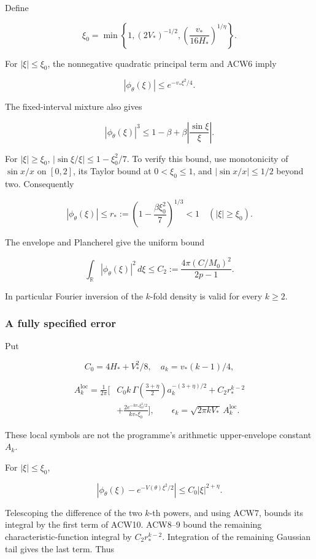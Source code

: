 Define

\[
\xi_0=\min\left\{1,(2V_*)^{-1/2},
\left(\frac{v_*}{16H_*}\right)^{1/\eta}\right\}.
\]

For \(|\xi|\le\xi_0\), the nonnegative quadratic principal term and ACW6 imply

\[
|\phi_\theta(\xi)|\le e^{-v_*\xi^2/4}.
\tag{ACW7}
\]

The fixed-interval mixture also gives

\[
|\phi_\theta(\xi)|^3\le1-\beta+\beta\left|\frac{\sin\xi}{\xi}\right|.
\]

For \(|\xi|\ge\xi_0\),
\(|\sin\xi/\xi|\le1-\xi_0^2/7\). To verify this bound, use monotonicity of \(\sin x/x\) on \([0,2]\), its Taylor bound at \(0<\xi_0\le1\), and \(|\sin x/x|\le1/2\) beyond two. Consequently

\[
|\phi_\theta(\xi)|\le r_*
:=\left(1-\frac{\beta\xi_0^2}{7}\right)^{1/3}<1
\quad(|\xi|\ge\xi_0).
\tag{ACW8}
\]

The envelope and Plancherel give the uniform bound

\[
\int_{\mathbb R}|\phi_\theta(\xi)|^2\,d\xi
\le C_2:=\frac{4\pi(C/M_0)^2}{2p-1}.
\tag{ACW9}
\]

In particular Fourier inversion of the \(k\)-fold density is valid for every \(k\ge2\).

\subsubsection{A fully specified error}\label{acw:a-fully-specified-error}

Put

\[
C_0=4H_*+V_*^2/8,\quad a_k=v_*(k-1)/4,
\]

\[
\begin{aligned}
A_k^{\mathrm{loc}}=\frac1{2\pi}\bigg[
&C_0 k\,\Gamma\!\left(\frac{3+\eta}{2}\right)
 a_k^{-(3+\eta)/2}
+C_2 r_*^{k-2}\\
&+\frac{2e^{-kv_*\xi_0^2/2}}{kv_*\xi_0}
\bigg],\qquad
\epsilon_k=\sqrt{2\pi kV_*}\,A_k^{\mathrm{loc}}.
\end{aligned}
\tag{ACW10}
\]

These local symbols are not the programme's arithmetic upper-envelope constant \(A_k\).

For \(|\xi|\le\xi_0\),

\[
|\phi_\theta(\xi)-e^{-V(\theta)\xi^2/2}|
\le C_0|\xi|^{2+\eta}.
\]

Telescoping the difference of the two \(k\)-th powers, and using ACW7, bounds its integral by the first term of ACW10. ACW8--9 bound the remaining characteristic-function integral by \(C_2r_*^{k-2}\). Integration of the remaining Gaussian tail gives the last term. Thus


